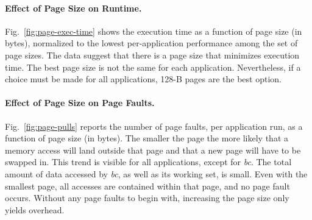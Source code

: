 \paragraph{Effect of Page Size on Runtime.}

Fig.~\ref{fig:page-exec-time} shows the execution time as a function
of page size (in bytes), normalized to the lowest per-application performance among the
set of page sizes.
The data suggest that there is a page size that minimizes execution time.
The best page size is not the same for
each application. Nevertheless, if a choice must be made for all applications,
128-B pages are the best option.

\paragraph{Effect of Page Size on Page Faults.}

Fig.~\ref{fig:page-pulls} reports the number of page faults, per application
run, as a function of page size (in bytes).
%
The smaller the page the more likely that a memory access will land
outside that page and that a new page will have to be swapped in.
%
This trend is visible for all applications, except for \textit{bc}. The total
amount of data accessed by \textit{bc}, as well as its working set, is small.
Even with the smallest page, all accesses are contained within that page, and
no page fault occurs. Without any page faults to begin with, increasing the
page size only yields overhead.

